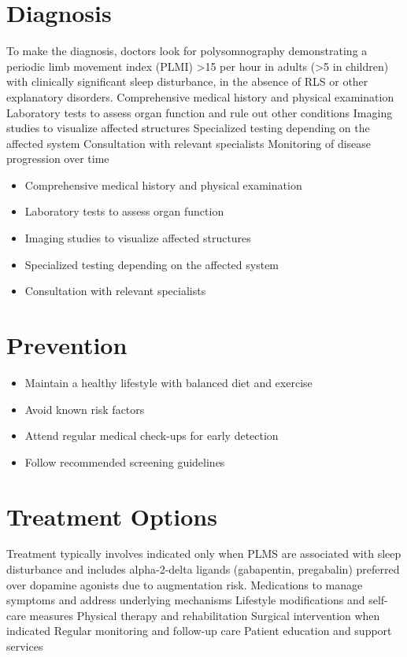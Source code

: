 \section{Diagnosis}
To make the diagnosis, doctors look for polysomnography demonstrating a periodic limb movement index (PLMI) >15 per hour in adults (>5 in children) with clinically significant sleep disturbance, in the absence of RLS or other explanatory disorders. Comprehensive medical history and physical examination Laboratory tests to assess organ function and rule out other conditions Imaging studies to visualize affected structures Specialized testing depending on the affected system Consultation with relevant specialists Monitoring of disease progression over time

\begin{itemize}[noitemsep]
  \item Comprehensive medical history and physical examination
  \item Laboratory tests to assess organ function
  \item Imaging studies to visualize affected structures
  \item Specialized testing depending on the affected system
  \item Consultation with relevant specialists
\end{itemize}
\section{Prevention}
\begin{itemize}[noitemsep]
  \item Maintain a healthy lifestyle with balanced diet and exercise
  \item Avoid known risk factors
  \item Attend regular medical check-ups for early detection
  \item Follow recommended screening guidelines
\end{itemize}
\section{Treatment Options}
Treatment typically involves indicated only when PLMS are associated with sleep disturbance and includes alpha-2-delta ligands (gabapentin, pregabalin) preferred over dopamine agonists due to augmentation risk. Medications to manage symptoms and address underlying mechanisms Lifestyle modifications and self-care measures Physical therapy and rehabilitation Surgical intervention when indicated Regular monitoring and follow-up care Patient education and support services

